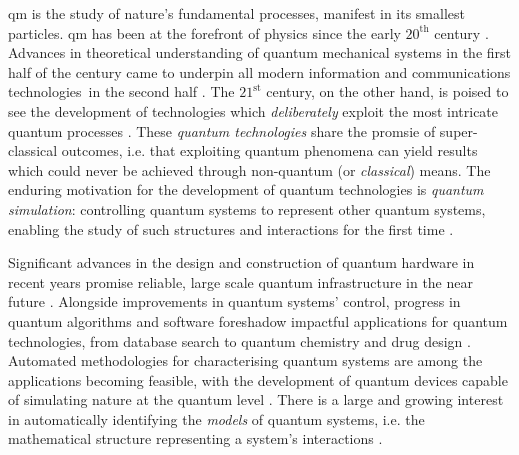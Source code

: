 \glsresetall

\Gls{qm} is the study of nature's fundamental processes, manifest in its smallest particles. 
\gls{qm} has been at the forefront of physics since the early $20^{\textrm{th}}$ century \cite{jammer1966conceptual}.
Advances in theoretical understanding of quantum mechanical systems in the first half of the century 
    \cite{einstein1905heuristic, born1926quantenmechanik, schrodinger1926undulatory, heisenberg1985quantentheoretische, von2018mathematical}
    came to underpin all modern information and communications technologies\footnotemark \ in the second half
    \cite{svelto2010principles, van2004principles}.
The $21^{\textrm{st}}$ century, on the other hand, is poised to see the development of 
    technologies which \emph{deliberately} exploit the most intricate quantum processes \cite{feynman1982simulating}. 
These \emph{quantum technologies} share the promsie of super-classical outcomes,
    i.e. that exploiting quantum phenomena can yield results which could never 
    be achieved through non-quantum (or \emph{classical}) means.  
The enduring motivation for the development of quantum technologies is \emph{quantum simulation}:
    controlling quantum systems to represent other quantum systems, 
    enabling the study of such structures and interactions for the first time \cite{feynman1982simulating, lloyd1996universal}. 
\par 

\par 

Significant advances in the design and construction of quantum hardware in 
    recent years promise reliable, large scale quantum infrastructure
    in the near future \cite{arute2019quantum, zhong2020quantum}. 
Alongside improvements in quantum systems' control, progress in quantum algorithms and software 
    foreshadow impactful applications for quantum technologies, 
    from database search \cite{grover1997quantum} to quantum chemistry \cite{cao2019quantum} and drug design \cite{cao2018potential}.
Automated methodologies for characterising quantum systems are among the applications becoming feasible, 
    with the development of quantum devices capable of
    simulating nature at the quantum level \cite{childs2018toward}. 
There is a large and growing interest in automatically identifying the \emph{models} of quantum systems, 
    i.e. the mathematical structure representing a system's interactions
    \cite{rigo2020machine, cranmer2020discovering, bairey2019learning, pickard2011ab, chertkov2018computational}.
\par 

